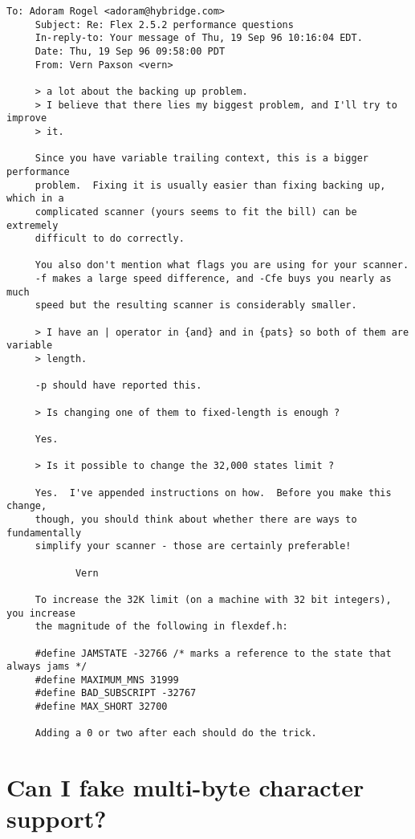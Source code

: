\documentclass[openany,oneside]{book}
\begin{document}
\begin{verbatim}
To: Adoram Rogel <adoram@hybridge.com>
     Subject: Re: Flex 2.5.2 performance questions
     In-reply-to: Your message of Thu, 19 Sep 96 10:16:04 EDT.
     Date: Thu, 19 Sep 96 09:58:00 PDT
     From: Vern Paxson <vern>
     
     > a lot about the backing up problem.
     > I believe that there lies my biggest problem, and I'll try to improve
     > it.
     
     Since you have variable trailing context, this is a bigger performance
     problem.  Fixing it is usually easier than fixing backing up, which in a
     complicated scanner (yours seems to fit the bill) can be extremely
     difficult to do correctly.
     
     You also don't mention what flags you are using for your scanner.
     -f makes a large speed difference, and -Cfe buys you nearly as much
     speed but the resulting scanner is considerably smaller.
     
     > I have an | operator in {and} and in {pats} so both of them are variable
     > length.
     
     -p should have reported this.
     
     > Is changing one of them to fixed-length is enough ?
     
     Yes.
     
     > Is it possible to change the 32,000 states limit ?
     
     Yes.  I've appended instructions on how.  Before you make this change,
     though, you should think about whether there are ways to fundamentally
     simplify your scanner - those are certainly preferable!
     
     		Vern
     
     To increase the 32K limit (on a machine with 32 bit integers), you increase
     the magnitude of the following in flexdef.h:
     
     #define JAMSTATE -32766 /* marks a reference to the state that always jams */
     #define MAXIMUM_MNS 31999
     #define BAD_SUBSCRIPT -32767
     #define MAX_SHORT 32700
     
     Adding a 0 or two after each should do the trick.
\end{verbatim}

\section{Can I fake multi-byte character support?}
\end{document}
